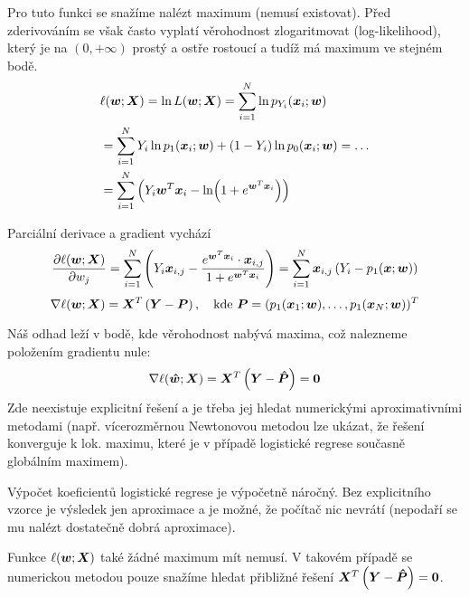 Pro tuto funkci se snažíme nalézt maximum (nemusí existovat). Před zderivováním se však často vyplatí věrohodnost zlogaritmovat (log-likelihood), který je na $(0, +\infty)$ prostý a ostře rostoucí a tudíž má maximum ve stejném bodě.
\begin{align*}
     & \ell(\bm{w}; \bm{X}) = \ln L(\bm{w}; \bm{X})
    = \sum_{i=1}^{N} \ln p_{Y_i}(\bm{x}_i; \bm{w})                                                \\
     & = \sum_{i=1}^{N} Y_i \ln p_{1}(\bm{x}_i; \bm{w}) + (1 - Y_i) \ln p_{0}(\bm{x}_i; \bm{w}) = \ldots \\
     & = \sum_{i=1}^{N} \left(Y_i \bm{w}^T\bm{x}_i - \ln(1+e^{\bm{w}^T\bm{x}_i})\right)
\end{align*}

Parciální derivace a gradient vychází
\begin{equation*}
    \pdv{\ell(\bm{w}; \bm{X})}{w_j}
    = \sum_{i=1}^{N} \left(Y_i \bm{x}_{i,j} - \frac{e^{\bm{w}^T\bm{x}_i} \cdot \bm{x}_{i,j}}{1+e^{\bm{w}^T\bm{x}_i}}\right) = \sum_{i=1}^{N} \bm{x}_{i,j} \left(Y_i - p_1(\bm{x}; \bm{w})\right)
\end{equation*}
\begin{equation*}
    \nabla \ell(\bm{w}; \bm{X})
    = \bm{X}^T\left(\bm{Y} - \bm{P}\right), \quad
    \text{kde } \bm{P} = (p_1(\bm{x}_1; \bm{w}), \ldots, p_1(\bm{x}_N; \bm{w}))^T
\end{equation*}

Náš odhad leží v bodě, kde věrohodnost nabývá maxima, což nalezneme položením gradientu nule:
\begin{equation*}
    \nabla \ell(\bm{\hat{w}}; \bm{X})
    = \bm{X}^T\left(\bm{Y} - \bm{\hat{P}}\right)
    = \bm{0}
\end{equation*}
Zde neexistuje explicitní řešení a je třeba jej hledat numerickými aproximativními metodami (např. vícerozměrnou Newtonovou metodou lze ukázat, že řešení konverguje k lok. maximu, které je v případě logistické regrese současně globálním maximem).

Výpočet koeficientů logistické regrese je výpočetně náročný. Bez explicitního vzorce je výsledek jen aproximace a je možné, že počítač nic nevrátí (nepodaří se mu nalézt dostatečně dobrá aproximace).

Funkce $\ell(\bm{w}; \bm{X})$ také žádné maximum mít nemusí. V takovém případě se numerickou metodou pouze snažíme hledat přibližné řešení $\bm{X}^T\left(\bm{Y} - \bm{\hat{P}}\right) = \bm{0}$.
